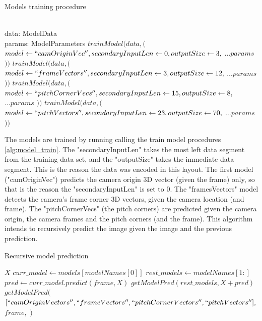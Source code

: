 \documentclass[
    11pt,
    oneside
]{report}
\begin{document}
\begin{algorithm}[H]
\begin{algorithmic}
\caption{Models training procedure}\label{alg:model_train}
\Require \\
    data: ModelData \\
    params: ModelParameters
\State
\State $trainModel( data, ($
    \State \indent $model \gets ``camOriginVec'', secondaryInputLen \gets 0, outputSize \gets 3,$
    \State \indent $\ldots params$ 
\State $) )$
\State $trainModel( data, ($
    \State \indent $model \gets ``frameVectors'', secondaryInputLen \gets 3, outputSize \gets 12,$
    \State \indent $\ldots params$ 
\State $) )$
\State $trainModel( data, ($
    \State \indent $model \gets ``pitchCornerVecs'', secondaryInputLen \gets 15, outputSize \gets 8,$
    \State \indent $\ldots params$ 
\State $) )$
\State $trainModel( data, ($
    \State \indent $model \gets ``pitchVectors'', secondaryInputLen \gets 23, outputSize \gets 70,$
    \State \indent $\ldots params$ 
\State $) )$
\end{algorithmic}
\end{algorithm}


The models are trained by running calling the train model procedures \ref{alg:model_train}. The "secondaryInputLen" takes the most left data segment from the training data set, and the "outputSize" takes the immediate data segment. This is the reason the data was encoded in this layout. The first model ("camOriginVec") predicts the camera origin 3D vector (given the frame) only, so that is the reason the "secondaryInputLen" is set to 0. The "framesVectors" model detects the camera's frame corner 3D vectors, given the camera location (and frame). The "pitchCornerVecs" (the pitch corners) are predicted given the camera origin, the camera frames and the pitch corners (and the frame). This algorithm intends to recursively predict the image given the image and the previous prediction.


\begin{algorithm}[H]
\begin{algorithmic}
\caption{Recursive model prediction}\label{alg:rec_pred}
        \State
        \Return $X$
    \EndIf
    \State $curr\_model \gets models[modelNames[0]]$ 
    \State $rest\_models \gets modelNames[1:]$
    \State $pred \gets curr\_model.predict(frame, X)$
    \State
    \Return $getModelPred(rest\_models, X + pred)$
\EndProcedure
{}
    \State
    \Return $getModelPred($
        \State \indent $[``camOriginVectors'', ``frameVectors'', ``pitchCornerVectors'', ``pitchVectors''],$
        \State \indent $frame,$
        \State \indent \emptyset
        \State
    \State $)$
\EndProcedure
\end{algorithmic}
\end{algorithm}
\end{document}
